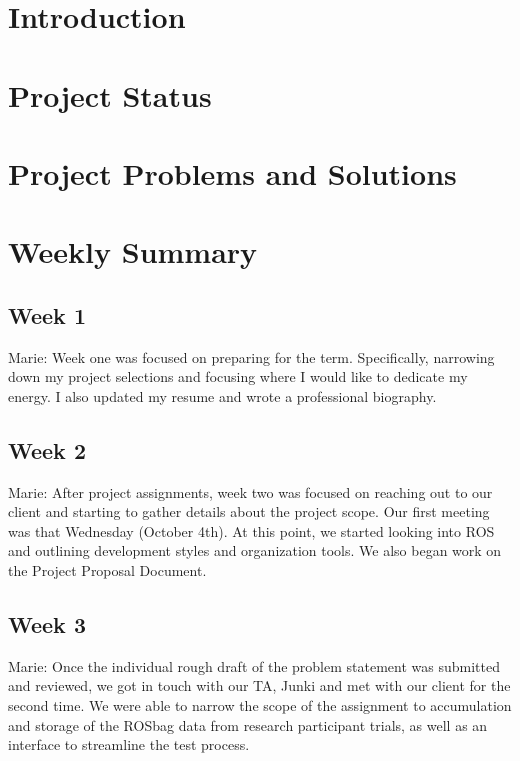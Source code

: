 \documentclass[onecolumn, draftclsnofoot,10pt, compsoc]{IEEEtran}
\begin{document}
\section{Introduction}


\section{Project Status}

\section{Project Problems and Solutions}

\section{Weekly Summary}

\subsection{Week 1}
Marie: Week one was focused on preparing for the term. Specifically, narrowing down my project selections and focusing where I would like to dedicate my energy. I also updated my resume and wrote a professional biography. 


\subsection{Week 2}
Marie: After project assignments, week two was focused on reaching out to our client and starting to gather details about the project scope. Our first meeting was that Wednesday (October 4th). At this point, we started looking into ROS and outlining development styles and organization tools. We also began work on the Project Proposal Document.


\subsection{Week 3}
Marie: Once the individual rough draft of the problem statement was submitted and reviewed, we got in touch with our TA, Junki and met with our client for the second time. We were able to narrow the scope of the assignment to accumulation and storage of the ROSbag data from research participant trials, as well as an interface to streamline the test process.
\end{document}
